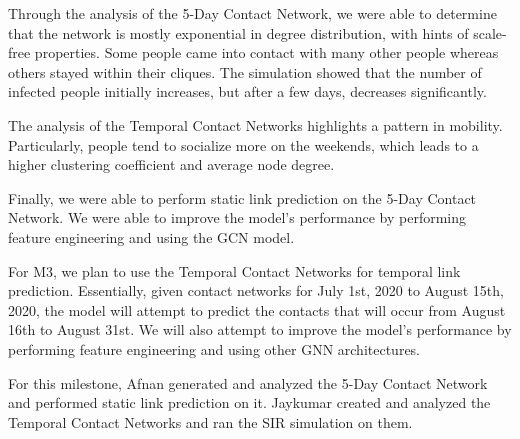 \documentclass[times, 10pt,twocolumn]{article}
\begin{document}


Through the analysis of the 5-Day Contact Network, we were able to determine that the network is mostly exponential in degree distribution, with hints of scale-free properties. Some people came into contact with many other people whereas others stayed within their cliques. The simulation showed that the number of infected people initially increases, but after a few days, decreases significantly.

The analysis of the Temporal Contact Networks highlights a pattern in mobility. Particularly, people tend to socialize more on the weekends, which leads to a higher clustering coefficient and average node degree.

Finally, we were able to perform static link prediction on the 5-Day Contact Network. We were able to improve the model's performance by performing feature engineering and using the GCN model. 

For M3, we plan to use the Temporal Contact Networks for temporal link prediction. Essentially, given contact networks for July 1st, 2020 to August 15th, 2020, the model will attempt to predict the contacts that will occur from August 16th to August 31st. We will also attempt to improve the model's performance by performing feature engineering and using other GNN architectures.

For this milestone, Afnan generated and analyzed the 5-Day Contact Network and performed static link prediction on it. Jaykumar created and analyzed the Temporal Contact Networks and ran the SIR simulation on them.


\end{document}
